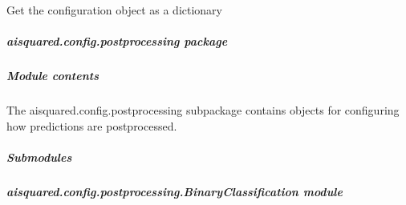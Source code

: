 \documentclass[letterpaper,10pt,english]{sphinxmanual}
\begin{document}
\begin{fulllineitems}

\begin{fulllineitems}
\label{\detokenize{aisquared.config.harvesting:aisquared.config.harvesting.TextHarvester.TextHarvester.to_dict}}
\pysigstartsignatures
{}
\pysigstopsignatures
\sphinxAtStartPar
Get the configuration object as a dictionary

\end{fulllineitems}


\end{fulllineitems}


\sphinxstepscope


\subparagraph{aisquared.config.postprocessing package}
\label{\detokenize{aisquared.config.postprocessing:aisquared-config-postprocessing-package}}\label{\detokenize{aisquared.config.postprocessing::doc}}

\subparagraph{Module contents}
\label{\detokenize{aisquared.config.postprocessing:module-aisquared.config.postprocessing}}\label{\detokenize{aisquared.config.postprocessing:module-contents}}
\sphinxAtStartPar
The aisquared.config.postprocessing subpackage contains objects for configuring how predictions are postprocessed.


\subparagraph{Submodules}
\label{\detokenize{aisquared.config.postprocessing:submodules}}

\subparagraph{aisquared.config.postprocessing.BinaryClassification module}
\label{\detokenize{aisquared.config.postprocessing:module-aisquared.config.postprocessing.BinaryClassification}}\label{\detokenize{aisquared.config.postprocessing:aisquared-config-postprocessing-binaryclassification-module}}
\end{document}
